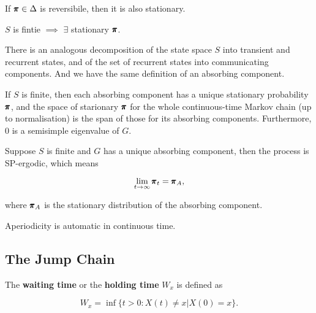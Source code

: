 \begin{proposition}
    If $\pmb{\pi} \in \Delta$ is reversibile, then it is also stationary.
\end{proposition}

\begin{proposition}
    $S$ is fintie $\implies$ $\exists$ stationary $\pmb{\pi}$.
\end{proposition}

There is an analogous decomposition of the state space $S$ into transient and recurrent states, and of the set of recurrent states into communicating components. And we have the same definition of an absorbing component. 

\begin{proposition}
    If $S$ is finite, then each absorbing component has a unique stationary probability $\pmb{\pi}$, and the space of starionary $\pmb{\pi}$ for the whole continuous-time Markov chain (up to normalisation) is the span of those for its absorbing components. Furthermore, $0$ is a semisimple eigenvalue of $G$.
\end{proposition}

\begin{theorem}
    Suppose $S$ is finite and $G$ has a unique absorbing component, then the process is SP-ergodic, which means 

    \begin{equation*}
        \lim_{t \to \infty} \pmb{\pi}_t = \pmb{\pi}_A, 
    \end{equation*}

    where $\pmb{\pi}_A$ is the stationary distribution of the absorbing component.
\end{theorem}

\begin{remark}
    Aperiodicity is automatic in continuous time.
\end{remark}

\subsection{The Jump Chain}

\begin{definition}
    The \textbf{waiting time} or the \textbf{holding time} $W_x$ is defined as 

    \begin{equation*}
        W_x = \inf\{t > 0: X(t) \neq x | X(0) = x \}.
    \end{equation*}
\end{definition}

